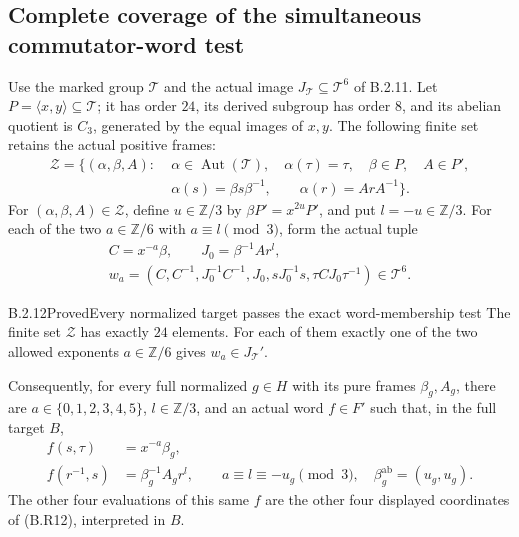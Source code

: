 \subsection{Complete coverage of the simultaneous commutator-word test}

Use the marked group $\mathcal T$ and the actual image
$J_{\mathcal T}\subseteq\mathcal T^6$ of B.2.11.  Let
$P=\langle x,y\rangle\subseteq\mathcal T$; it has order
$24$, its derived subgroup has order $8$, and its abelian
quotient is $C_3$, generated by the equal images of $x,y$.
The following finite set retains the actual positive frames:
\[
\begin{split}
 \mathcal Z=\{(\alpha,\beta,A):\;&
 \alpha\in\operatorname{Aut}(\mathcal T),\quad
 \alpha(\tau)=\tau,\quad\beta\in P,\quad A\in P',\\
 &\alpha(s)=\beta s\beta^{-1},\qquad
 \alpha(r)=ArA^{-1}\}.
\end{split}                                                    \tag{B.R11}
\]
For $(\alpha,\beta,A)\in\mathcal Z$, define $u\in\mathbb Z/3$
by $\beta P'=x^{2u}P'$, and put $l=-u\in\mathbb Z/3$.
For each of the two $a\in\mathbb Z/6$ with $a\equiv l\pmod3$,
form the actual tuple
\[
\begin{gathered}
 C=x^{-a}\beta,\qquad J_0=\beta^{-1}Ar^l,\\
 w_a=(C,C^{-1},J_0^{-1}C^{-1},J_0,
                 sJ_0^{-1}s,\tau C J_0\tau^{-1})
                    \in\mathcal T^6.
\end{gathered}                                                 \tag{B.R12}
\]

\begin{result}{B.2.12}{Proved}{Every normalized target passes the exact word-membership test}
The finite set $\mathcal Z$ has exactly $24$ elements.
For each of them exactly one of the two allowed exponents
$a\in\mathbb Z/6$ gives $w_a\in J_{\mathcal T}'$.

Consequently, for every full normalized $g\in H$ with its
pure frames $\beta_g,A_g$, there are
$a\in\{0,1,2,3,4,5\}$, $l\in\mathbb Z/3$, and an actual
word $f\in F'$ such that, in the full target $B$,
\[
 \begin{aligned}
 f(s,\tau)&=x^{-a}\beta_g,\\
 f(r^{-1},s)&=\beta_g^{-1}A_g r^l,
 \qquad a\equiv l\equiv-u_g\pmod3,
 \quad\beta_g^{\mathrm{ab}}=(u_g,u_g).
 \end{aligned}                                                 \tag{B.R13}
\]
The other four evaluations of this same $f$ are the other
four displayed coordinates of (B.R12), interpreted in $B$.
\end{result}


